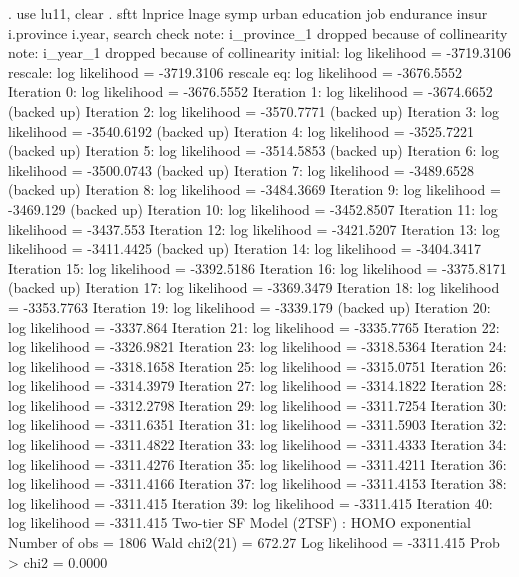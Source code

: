 . use lu11, clear
{\smallskip}
. sftt lnprice lnage symp urban education job endurance insur i.province i.year, search check
note: i_province_1 dropped because of collinearity
note: i_year_1 dropped because of collinearity
{\smallskip}
initial:       log likelihood = -3719.3106
rescale:       log likelihood = -3719.3106
rescale eq:    log likelihood = -3676.5552
Iteration 0:   log likelihood = -3676.5552  
Iteration 1:   log likelihood = -3674.6652  (backed up)
Iteration 2:   log likelihood = -3570.7771  (backed up)
Iteration 3:   log likelihood = -3540.6192  (backed up)
Iteration 4:   log likelihood = -3525.7221  (backed up)
Iteration 5:   log likelihood = -3514.5853  (backed up)
Iteration 6:   log likelihood = -3500.0743  (backed up)
Iteration 7:   log likelihood = -3489.6528  (backed up)
Iteration 8:   log likelihood = -3484.3669  
Iteration 9:   log likelihood =  -3469.129  (backed up)
Iteration 10:  log likelihood = -3452.8507  
Iteration 11:  log likelihood =  -3437.553  
Iteration 12:  log likelihood = -3421.5207  
Iteration 13:  log likelihood = -3411.4425  (backed up)
Iteration 14:  log likelihood = -3404.3417  
Iteration 15:  log likelihood = -3392.5186  
Iteration 16:  log likelihood = -3375.8171  (backed up)
Iteration 17:  log likelihood = -3369.3479  
Iteration 18:  log likelihood = -3353.7763  
Iteration 19:  log likelihood =  -3339.179  (backed up)
Iteration 20:  log likelihood =  -3337.864  
Iteration 21:  log likelihood = -3335.7765  
Iteration 22:  log likelihood = -3326.9821  
Iteration 23:  log likelihood = -3318.5364  
Iteration 24:  log likelihood = -3318.1658  
Iteration 25:  log likelihood = -3315.0751  
Iteration 26:  log likelihood = -3314.3979  
Iteration 27:  log likelihood = -3314.1822  
Iteration 28:  log likelihood = -3312.2798  
Iteration 29:  log likelihood = -3311.7254  
Iteration 30:  log likelihood = -3311.6351  
Iteration 31:  log likelihood = -3311.5903  
Iteration 32:  log likelihood = -3311.4822  
Iteration 33:  log likelihood = -3311.4333  
Iteration 34:  log likelihood = -3311.4276  
Iteration 35:  log likelihood = -3311.4211  
Iteration 36:  log likelihood = -3311.4166  
Iteration 37:  log likelihood = -3311.4153  
Iteration 38:  log likelihood =  -3311.415  
Iteration 39:  log likelihood =  -3311.415  
Iteration 40:  log likelihood =  -3311.415  
{\smallskip}
Two-tier SF Model (2TSF) : HOMO exponential       Number of obs   =       1806
                                                  Wald chi2(21)   =     672.27
Log likelihood =  -3311.415                       Prob > chi2     =     0.0000
{\smallskip}
